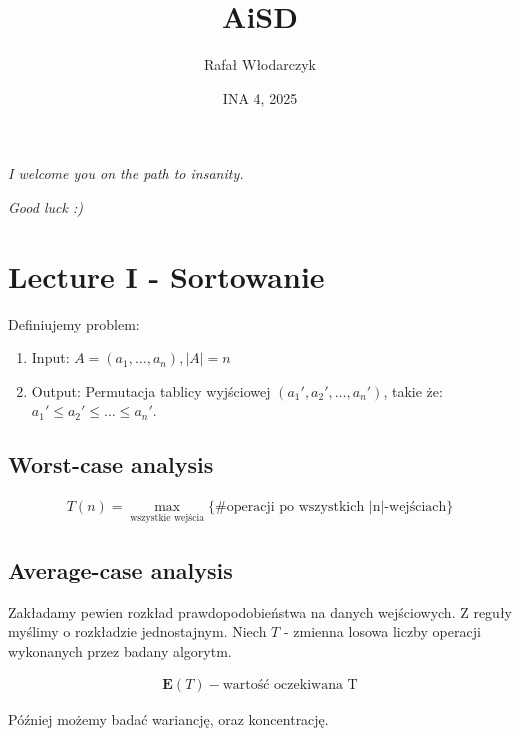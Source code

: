 \documentclass{article}
\title{AiSD}
\author{Rafał Włodarczyk}
\date{INA 4, 2025}
\numberwithin{equation}{subsection}
\begin{document}
\maketitle

\tableofcontents

\begin{center}
    \textit{I welcome you on the path to insanity.}
\end{center}

\begin{center}
    \textit{Good luck :)}
\end{center}

\newpage

\section{Lecture I - Sortowanie}

Definiujemy problem:

\begin{enumerate}
    \item Input: $A=(a_1,\dots,a_n), |A|=n$
    \item Output: Permutacja tablicy wyjściowej $(a_1',a_2',\dots,a_n')$, takie że: $a_1'\leq a_2' \leq \dots \leq a_n'$.
\end{enumerate}

\subsection{Worst-case analysis}

\begin{align}
    T(n) = \max_{\text{wszystkie wejścia}}\{\text{\#operacji po wszystkich |n|-wejściach}\}
\end{align}

\subsection{Average-case analysis}

Zakładamy pewien rozkład prawdopodobieństwa na danych wejściowych. Z reguły myślimy o rozkładzie jednostajnym. Niech $T$ - zmienna losowa liczby operacji wykonanych przez badany algorytm.

\begin{align}
    \mathbf{E}(T) - \text{wartość oczekiwana T}
\end{align}

\noindent
Później możemy badać wariancję, oraz koncentrację.
\end{document}
